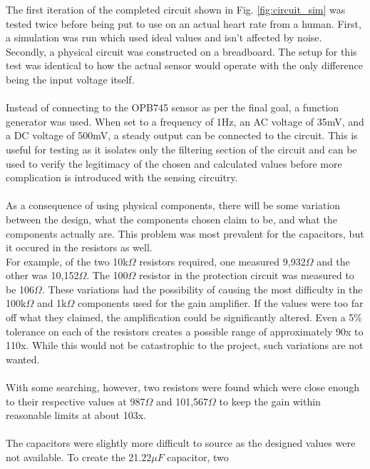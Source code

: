 \documentclass[conference]{IEEEtran}
\begin{document}
    The first iteration of the completed circuit shown in Fig.
    \ref{fig:circuit_sim} was tested twice before being put to use on an actual
    heart rate from a human. First, a simulation was run which used ideal
    values and isn't affected by noise. Secondly, a physical circuit was
    constructed on a breadboard. The setup for this test was identical to how
    the actual sensor would operate with the only difference being the input
    voltage itself. \\ \\
    Instead of connecting to the OPB745 sensor as per the final goal, a
    function generator was used. When set to a frequency of 1Hz, an AC voltage
    of 35mV, and a DC voltage of 500mV, a steady output can be connected to
    the circuit. This is useful for testing as it isolates only the filtering
    section of the circuit and can be used to verify the legitimacy of the
    chosen and calculated values before more complication is introduced with
    the sensing circuitry. \\ \\
    As a consequence of using physical components, there will be some
    variation between the design, what the components chosen claim to be, and
    what the components actually are. This problem was most prevalent for the
    capacitors, but it occured in the resistors as well. \\
    For example, of the two 10k$\Omega$ resistors required, one measured
    9,932$\Omega$ and the other was 10,152$\Omega$. The 100$\Omega$ resistor
    in the protection circuit was measured to be 106$\Omega$. These variations
    had the possibility of causing the most difficulty in the 100k$\Omega$ and
    1k$\Omega$ components used for the gain amplifier. If the values were too
    far off what they claimed, the amplification could be significantly
    altered. Even a 5\% tolerance on each of the resistors creates a possible
    range of approximately 90x to 110x. While this would not be catastrophic
    to the project, such variations are not wanted. \\ \\
    With some searching, however, two resistors were found which were close
    enough to their respective values at 987$\Omega$ and 101,567$\Omega$ to
    keep the gain within reasonable limits at about 103x. \\ \\
    The capacitors were slightly more difficult to source as the designed
    values were not available. To create the 21.22$\mu F$ capacitor, two
\end{document}
